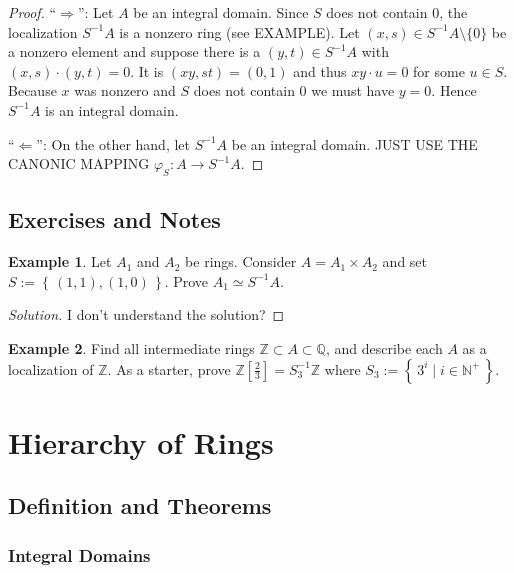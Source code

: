 \documentclass[a4paper]{book}
\theoremstyle{definition}
\newtheorem{example}{Example}[definition]
\newcommand{\set}[1]{\left\{\, #1 \,\right\}}
\newcommand{\makeset}[2]{\left\{\, #1 \mid #2 \,\right\}}
\begin{document}
\begin{proof}
    ``\(\Rightarrow\)'': Let \(A\) be an integral domain. Since \(S\) does not contain \(0\), the localization \(S^{-1}A\) is a nonzero ring (see EXAMPLE). Let \((x, s) \in S^{-1}A \setminus \{0\}\) be a nonzero element and suppose there is a \((y, t) \in S^{-1}A\) with \((x, s) \cdot (y, t) = 0\). It is \((xy, st) = (0, 1)\) and thus \(xy \cdot u = 0\) for some \(u \in S\). Because \(x\) was nonzero and \(S\) does not contain \(0\) we must have \(y = 0\). Hence \(S^{-1}A\) is an integral domain.

    ``\(\Leftarrow\)'': On the other hand, let \(S^{-1}A\) be an integral domain. JUST USE THE CANONIC MAPPING \(\varphi_S: A \longrightarrow S^{-1}A\).
\end{proof}

\section{Exercises and Notes}

\begin{example}
    Let \(A_1\) and \(A_2\) be rings. Consider \(A = A_1 \times A_2\) and set \(S := \set{(1, 1), (1, 0)}\). Prove \(A_1 \simeq S^{-1}A\).
\end{example}

\begin{proof}[Solution]
    I don't understand the solution?
\end{proof}


\begin{example}
    Find all intermediate rings \(\mathbb{Z} \subset A \subset \mathbb{Q}\), and describe each \(A\) as a localization of \(\mathbb{Z}\). As a starter, prove \(\mathbb{Z}\left[\frac{2}{3}\right] = S_3^{-1} \mathbb{Z}\) where \(S_3 := \makeset{3^i}{i \in \mathbb{N}^+}\).
\end{example}

\chapter{Hierarchy of Rings}
\section{Definition and Theorems}
\subsection{Integral Domains}
\end{document}
